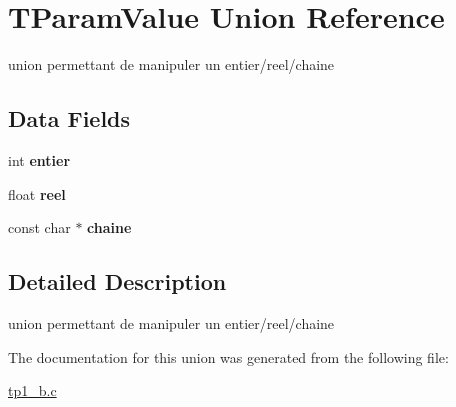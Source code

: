 \hypertarget{unionTParamValue}{\section{T\-Param\-Value Union Reference}
\label{unionTParamValue}
}


union permettant de manipuler un entier/reel/chaine  


\subsection*{Data Fields}
\begin{DoxyCompactItemize}
\item 
\hypertarget{unionTParamValue_a85a2847d254115d744ac7d55391dc1ea}{int {\bfseries entier}}\label{unionTParamValue_a85a2847d254115d744ac7d55391dc1ea}

\item 
\hypertarget{unionTParamValue_a6c6e99a421de592ad46cf47aab9cef58}{float {\bfseries reel}}\label{unionTParamValue_a6c6e99a421de592ad46cf47aab9cef58}

\item 
\hypertarget{unionTParamValue_a3e12f31017e3dd1bb79801330f767a22}{const char $\ast$ {\bfseries chaine}}\label{unionTParamValue_a3e12f31017e3dd1bb79801330f767a22}

\end{DoxyCompactItemize}


\subsection{Detailed Description}
union permettant de manipuler un entier/reel/chaine 

The documentation for this union was generated from the following file\-:\begin{DoxyCompactItemize}
\item 
\hyperlink{tp1__b_8c}{tp1\-\_\-b.\-c}\end{DoxyCompactItemize}
